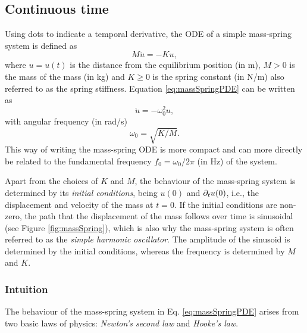 \subsection{Continuous time}\label{sec:massSpringCont}
Using dots to indicate a temporal derivative, the ODE of a simple mass-spring system is defined as
\begin{equation}\label{eq:massSpringPDE}
    M\ddot u = -Ku,
\end{equation}
where $u = u(t)$ is the distance from the equilibrium position (in m), $M>0$ is the mass of the mass (in kg) and $K\geq 0$ is the spring constant (in N/m) also referred to as the spring stiffness. Equation \eqref{eq:massSpringPDE} can be written as
\begin{equation}\label{eq:massSpringCompact}
    \ddot u = -\omega_0^2u,
\end{equation}
with angular frequency (in rad/s)
\begin{equation}\label{eq:omega0MassSpring}
    \omega_0 = \sqrt{K/M}.
\end{equation}
This way of writing the mass-spring ODE is more compact and can more directly be related to the fundamental frequency $f_0 = \omega_0 / 2 \pi$ (in Hz) of the system. 

Apart from the choices of $K$ and $M$, the behaviour of the mass-spring system is determined by its \textit{initial conditions}, being $u(0)$ and $\partial_t u(0)$, i.e., the displacement and velocity of the mass at $t = 0$. If the initial conditions are non-zero, the path that the displacement of the mass follows over time is sinusoidal (see Figure \ref{fig:massSpring}), which is also why the mass-spring system is often referred to as the \textit{simple harmonic oscillator}. The amplitude of the sinusoid is determined by the initial conditions, whereas the frequency is determined by $M$ and $K$. 



\subsubsection{Intuition}
The behaviour of the mass-spring system in Eq. \eqref{eq:massSpringPDE} arises from two basic laws of physics: \textit{Newton's second law} and \textit{Hooke's law}. 

